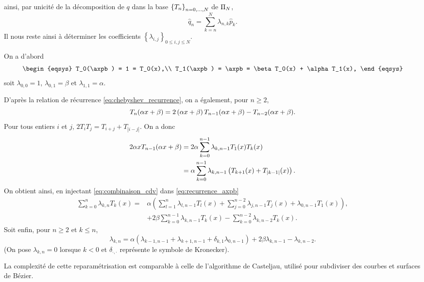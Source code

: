 ainsi, par unicité de la décomposition de $q$ dans la base $\left\{{T}_{n}\right\}_{{n}={0},\ldots,{N}}$ de $\Pi_{N}$,
\begin{equation}
	\hat{q}_n = \sum_{k=n}^{N} \lambda_{n,k} \hat{p}_k.
\end{equation}
%
Il nous reste ainsi à déterminer les coefficients $\left\{ \lambda_{i,j} \right\}_{0 \leq i,j \leq N}$.
\par\bigskip
On a d'abord
\begin{equation*}
	\begin{eqsys}
		T_0(\axpb) = 1 = T_0(x),\\
		T_1(\axpb) = \axpb = \beta T_0(x) + \alpha T_1(x),
	\end{eqsys}
\end{equation*}
soit $\lambda_{0,0} = 1$, $\lambda_{0,1} = \beta$ et $\lambda_{1,1} = \alpha$.
\par
D'après la relation de récurrence \eqref{eq:chebyshev_recurrence}, on a également, pour $n \geq 2$,
\begin{equation}
	T_n(\alpha x + \beta) =
	2 \left(\alpha x + \beta\right) T_{n-1}(\alpha x + \beta) 
	- T_{n-2}(\alpha x + \beta).
	\label{eq:recurrence_axpb}
\end{equation}
%
Pour tous entiers $i$ et $j$, $2 T_i T_j = T_{i+j} + T_{\left|i - j\right|}$. On a donc%
\begin{align*}
	2 \alpha x T_{n-1}(\alpha x + \beta) &=
	2 \alpha \sum_{k=0}^{n-1} \lambda_{k,n-1} T_1(x) T_k(x) \\
	&= \alpha \sum_{k=0}^{n-1} \lambda_{k,n-1} \left(T_{k+1}(x) + T_{\left|k-1\right|}(x)\right).
\end{align*}
%
On obtient ainsi, en injectant \eqref{eq:combinaison_cdv} dans \eqref{eq:recurrence_axpb}
\begin{align*}
	\sum_{k=0}^{n} \lambda_{k,n} T_k(x) = 
	&\alpha \left(
	\sum_{l=1}^{n} \lambda_{l,n-1} T_l(x) +
	\sum_{j=0}^{n-2} \lambda_{j,n-1} T_j(x) +
	\lambda_{0,n-1} T_1(x)
	\right), \\
	&+ 2 \beta \sum_{k=0}^{n-1} \lambda_{k,n-1} T_k(x)
	- \sum_{k=0}^{n-2} \lambda_{k,n-2} T_k(x).
\end{align*}
%
Soit enfin, pour $n \geq 2$ et $k \leq n$,
\begin{equation}
	\lambda_{k,n} = 
	\alpha \left(
	\lambda_{k-1,n-1} + \lambda_{k+1,n-1} + \delta_{k,1} \lambda_{0,n-1}
	\right)
	+ 2 \beta \lambda_{k,n-1} - \lambda_{k,n-2}.
\end{equation}
(On pose $\lambda_{k,n} = 0$ lorsque $k < 0$ et $\delta_{\cdot,\cdot}$ représente le symbole de Kronecker).\par
%
La complexité de cette reparamétrisation est comparable à celle de l'algorithme de Casteljau, utilisé pour subdiviser des courbes et surfaces de Bézier.